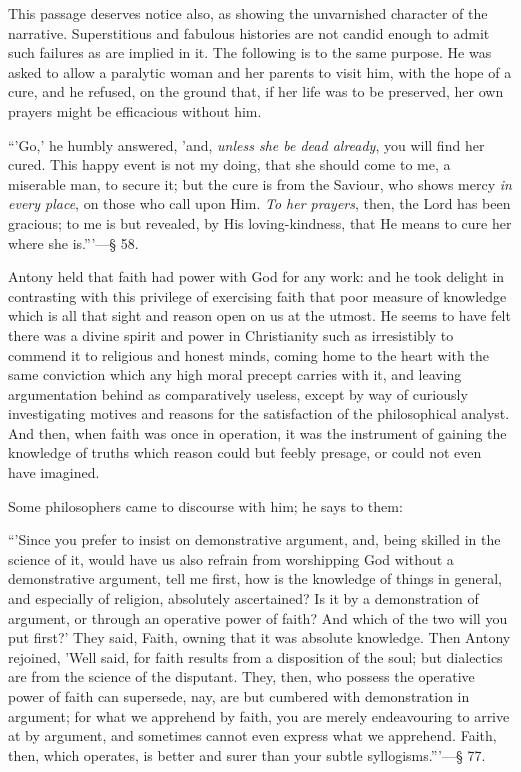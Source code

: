 This passage deserves notice also, as showing the unvarnished
character of the narrative. Superstitious and fabulous histories are
not candid enough to admit such failures as are implied in it. The
following is to the same purpose. He was asked to allow a paralytic
woman and her parents to visit him, with the hope of a cure, and he
refused, on the ground that, if her life was to be preserved, her own
prayers might be efficacious without him.

``'Go,' he humbly answered, 'and, \emph{unless she be dead already},
you will find her cured. This happy event is not my doing, that she
should come to me, a miserable man, to secure it; but the cure is from
the Saviour, who shows mercy \emph{in every place}, on those who call
upon Him. \emph{To her prayers}, then, the Lord has been gracious; to
me is but revealed, by His loving-kindness, that He means to cure her
where she is.'''—§ 58.

Antony held that faith had power with God for any work: and he took
delight in contrasting with this privilege of exercising faith that
poor measure of knowledge which is all that sight and reason open on
us at the utmost. He seems to have felt there was a divine spirit and
power in Christianity such as irresistibly to commend it to religious
and honest minds, coming home to the heart with the same conviction
which any high moral precept carries with it, and leaving
argumentation behind as comparatively useless, except by way of
curiously investigating motives and reasons for the satisfaction of
the philosophical analyst. And then, when faith was once in operation,
it was the instrument of gaining the knowledge of truths which
reason could but feebly presage, or could not even have imagined.

Some philosophers came to discourse with him; he says to them:

``'Since you prefer to insist on demonstrative argument, and,
being skilled in the science of it, would have us also refrain from
worshipping God without a demonstrative argument, tell me first, how
is the knowledge of things in general, and especially of religion,
absolutely ascertained? Is it by a demonstration of argument, or
through an operative power of faith? And which of the two will you put
first?' They said, Faith, owning that it was absolute knowledge. Then
Antony rejoined, 'Well said, for faith results from a disposition of
the soul; but dialectics are from the science of the disputant. They,
then, who possess the operative power of faith can supersede, nay, are
but cumbered with demonstration in argument; for what we apprehend by
faith, you are merely endeavouring to arrive at by argument, and
sometimes cannot even express what we apprehend. Faith, then, which
operates, is better and surer than your subtle syllogisms.'''—§
77.

